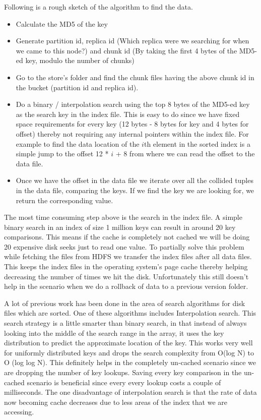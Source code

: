 \documentclass[10pt,twocolumn,preprint,natbib,authoryear]{sigplanconf}
\begin{document}
Following is a rough sketch of the algorithm to find the data. 

\begin{itemize}
	\item Calculate the MD5 of the key
	\item Generate partition id, replica id (Which replica were we searching for when we came to this node?) and chunk id (By taking the first 4 bytes of the MD5-ed key, modulo the number of chunks)
	\item Go to the store's folder and find the chunk files having the above chunk id in the bucket (partition id and replica id). 
	\item Do a binary / interpolation search using the top 8 bytes of the MD5-ed key as the search key in the index file. This is easy to do since we have fixed space requirements for every key (12 bytes - 8 bytes for key and 4 bytes for offset) thereby not requiring any internal pointers within the index file. For example to find the data location of the $i$th element in the sorted index is a simple jump to the offset 12 * $i$ + 8 from where we can read the offset to the data file.  
	\item Once we have the offset in the data file we iterate over all the collided tuples in the data file, comparing the keys. If we find the key we are looking for, we return the corresponding value.
\end{itemize}

The most time consuming step above is the search in the index file. A simple binary search in an index of size 1 million keys can result in around 20 key comparisons. This means if the cache is completely not cached we will be doing 20 expensive disk seeks just to read one value. To partially solve this problem while fetching the files from HDFS we transfer the index files after all data files. This keeps the index files in the operating system's page cache thereby helping decreasing the number of times we hit the disk. Unfortunately this still doesn't help in the scenario when we do a rollback of data to a previous version folder. 

A lot of previous work has been done in the area of search algorithms for disk files which are sorted. One of these algorithms includes Interpolation search\cite{manolopoulos}. This search strategy is a little smarter than binary search, in that instead of always looking into the middle of the search range in the array, it uses the key distribution to predict the approximate location of the key. This works very well for uniformly distributed keys and drops the search complexity from O(log N) to O (log log N). This definitely helps in the completely un-cached scenario since we are dropping the number of key lookups. Saving every key comparison in the un-cached scenario is beneficial since every every lookup costs a couple of milliseconds. The one disadvantage of interpolation search is that the rate of data now becoming cache decreases due to less areas of the index that we are accessing. 
\end{document}
